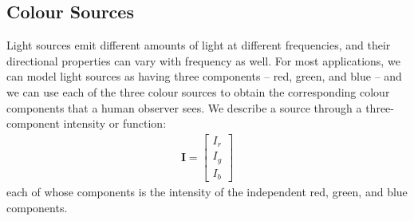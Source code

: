\documentclass[../COS3712_Notes.tex]{subfiles}
\begin{document}
      \subsection{Colour Sources}
        Light sources emit different amounts of light at different frequencies,
        and their directional properties can vary with frequency as well.
        For most applications, we can model light sources as having three components
        -- red, green, and blue --
        and we can use each of the three colour sources to obtain the corresponding
        colour components that a human observer sees.
        We describe a source through a three-component intensity or  function:
        \begin{align*}
          \mathbf{I} = \begin{bmatrix}
            I_r \\
            I_g \\
            I_b
          \end{bmatrix}
        \end{align*}
        each of whose components is the intensity of the independent red, green, and blue components.
\end{document}
